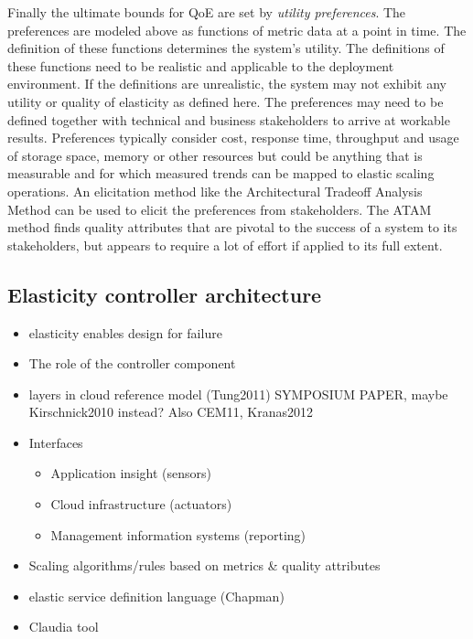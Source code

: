 \documentclass[english]{tktltiki2}
\theoremstyle{definition}
\theoremstyle{remark}
\begin{document}
Finally the ultimate bounds for QoE are set by \textit{utility preferences}. The
preferences are modeled above as functions of metric data at a point in time.
The definition of these functions determines the system's utility. The
definitions of these functions need to be realistic and applicable to the
deployment environment. If the definitions are unrealistic, the system may not
exhibit any utility or quality of elasticity as defined here.  The preferences
may need to be defined together with technical and business stakeholders to
arrive at workable results. Preferences typically consider cost, response time, throughput and usage of storage space, memory or other resources but could be anything that is measurable and for which measured trends can be mapped to elastic scaling operations. An elicitation method like the Architectural
Tradeoff Analysis Method  can be used to elicit the preferences
from stakeholders. The ATAM method finds quality attributes that are pivotal to the success of a system to its stakeholders, but appears to require a lot of effort if applied to its full extent.

\subsection{Elasticity controller architecture}

\begin{itemize}
\item elasticity enables design for failure
\item The role of the controller component
\item layers in cloud reference model (Tung2011) SYMPOSIUM PAPER, maybe Kirschnick2010 instead? Also CEM11, Kranas2012
\item Interfaces
	\begin{itemize}
	\item Application insight (sensors)
	\item Cloud infrastructure (actuators)
	\item Management information systems (reporting)
	\end{itemize}
\item Scaling algorithms/rules based on metrics \& quality attributes
\item elastic service definition language (Chapman)
\item Claudia tool
\end{itemize}
\end{document}
